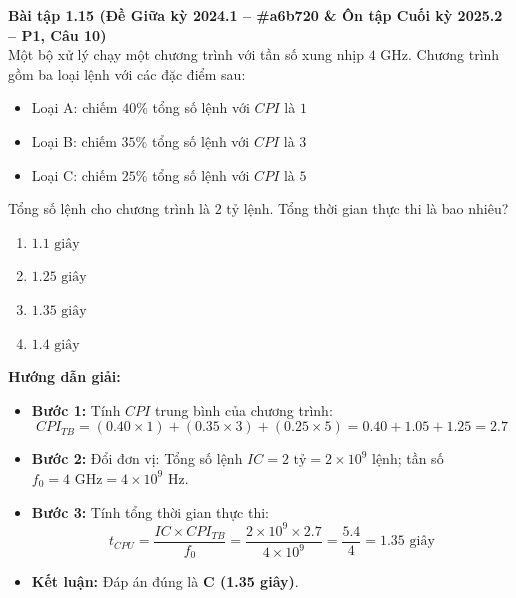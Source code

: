 \textbf{Bài tập 1.15 (Đề Giữa kỳ 2024.1 -- \#a6b720 \& Ôn tập Cuối kỳ 2025.2 -- P1, Câu 10)}\\
Một bộ xử lý chạy một chương trình với tần số xung nhịp $4\text{ GHz}$. Chương trình gồm ba loại lệnh với các đặc điểm sau:
\begin{itemize}
    \item Loại A: chiếm $40\%$ tổng số lệnh với $CPI$ là $1$
    \item Loại B: chiếm $35\%$ tổng số lệnh với $CPI$ là $3$
    \item Loại C: chiếm $25\%$ tổng số lệnh với $CPI$ là $5$
\end{itemize}
Tổng số lệnh cho chương trình là $2\text{ tỷ lệnh}$. Tổng thời gian thực thi là bao nhiêu?
\begin{enumerate}[label=\Alph*.]
    \item $1.1\text{ giây}$
    \item $1.25\text{ giây}$
    \item $1.35\text{ giây}$
    \item $1.4\text{ giây}$
\end{enumerate}
\textbf{Hướng dẫn giải:}
\begin{itemize}
    \item \textbf{Bước 1:} Tính $CPI$ trung bình của chương trình:
    $$CPI_{TB} = (0.40 \times 1) + (0.35 \times 3) + (0.25 \times 5) = 0.40 + 1.05 + 1.25 = 2.7$$
    \item \textbf{Bước 2:} Đổi đơn vị: Tổng số lệnh $IC = 2\text{ tỷ} = 2 \times 10^9\text{ lệnh}$; tần số $f_0 = 4\text{ GHz} = 4 \times 10^9\text{ Hz}$.
    \item \textbf{Bước 3:} Tính tổng thời gian thực thi:
    $$t_{CPU} = \frac{IC \times CPI_{TB}}{f_0} = \frac{2 \times 10^9 \times 2.7}{4 \times 10^9} = \frac{5.4}{4} = 1.35\text{ giây}$$
    \item \textbf{Kết luận:} Đáp án đúng là \textbf{C (1.35 giây)}.
\end{itemize}


